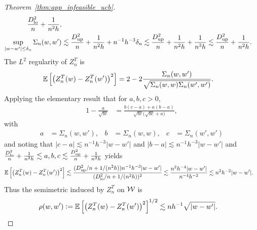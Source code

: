 \begin{proof}[Theorem~\ref{thm:app_infeasible_ucb}]
\begin{align*}
    \frac{D_{\textup{lo}}^2}{n}
    + \frac{1}{n^2h}, \\
    \sup_{|w-w'| \leq \delta_n}
    \Sigma_n(w,w')
    &\lesssim
    \frac{D_{\textup{up}}^2}{n}
    + \frac{1}{n^2h}
    + n^{-1} h^{-3} \delta_n
    \lesssim
    \frac{D_{\textup{up}}^2}{n}
    + \frac{1}{n^2h}
    + \frac{1}{n^3h}
    \lesssim
    \frac{D_{\textup{up}}^2}{n}
    + \frac{1}{n^2h}.
  \end{align*}
  The $L^2$
  regularity of $Z_n^T$
  is
  \begin{align*}
    \mathbb{E}\left[
      \big(
      Z_n^T(w) - Z_n^T(w')
      \big)^2
    \right]
    &=
    2 - 2
    \frac{\Sigma_n(w,w')}
    {\sqrt{\Sigma_n(w,w) \Sigma_n(w',w')}}.
  \end{align*}
  Applying the elementary result
  that for $a,b,c > 0$,
  \begin{align*}
    1 - \frac{a}{\sqrt{b c}}
    &=
    \frac{b(c-a) + a(b-a)}
    {\sqrt{b c}\big(\sqrt{b c} + a\big)},
  \end{align*}
  with
  \begin{align*}
    a&= \Sigma_n(w,w'),
    &b                &= \Sigma_n(w,w),
    &c                &= \Sigma_n(w',w')
  \end{align*}
  and noting that
  $|c-a| \lesssim n^{-1} h^{-3} |w-w'|$
  and
  $|b-a| \lesssim n^{-1} h^{-3} |w-w'|$
  and
  $\frac{D_{\textup{lo}}^2}{n} + \frac{1}{n^2h}
  \lesssim a,b,c
  \lesssim \frac{D_{\textup{up}}^2}{n} + \frac{1}{n^2h}$
  yields
  \begin{align*}
    \mathbb{E}\left[
      \big(
      Z_n^T(w) - Z_n^T(w')
      \big)^2
    \right]
    &\lesssim
    \frac{(D_{\textup{up}}^2/n + 1/(n^2h))n^{-1}h^{-3}|w-w'|}
    {(D_{\textup{lo}}^2/n + 1/(n^2h))^2}
    \lesssim
    \frac{n^{2} h^{-4}|w-w'|}
    {n^{-4}h^{-2}}
    \lesssim
    n^2 h^{-2} |w-w'|.
  \end{align*}
  Thus the semimetric
  induced by $Z_n^T$ on $\mathcal{W}$ is
  \begin{align*}
    \rho(w,w')
    &\vcentcolon=
    \mathbb{E}\left[
      \big(
      Z_n^T(w) - Z_n^T(w')
      \big)^2
    \right]^{1/2}
    \lesssim
    n h^{-1} \sqrt{|w-w'|}.
  \end{align*}



\end{proof}

